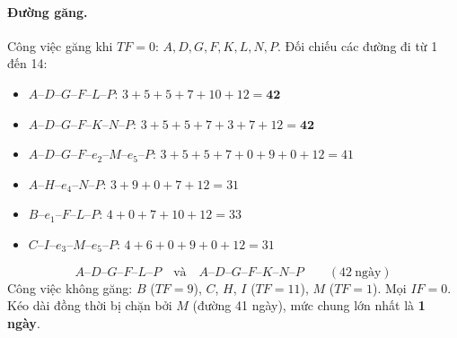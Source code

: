 \documentclass[12pt,a4paper]{article}
\begin{document}
\paragraph{Đường găng.}
\enlargethispage{3\baselineskip}
Công việc găng khi $TF=0$: $A,D,G,F,K,L,N,P$.
Đối chiếu các đường đi từ 1 đến 14:
\begin{itemize}[leftmargin=1.4em,itemsep=1pt,parsep=0pt,topsep=2pt]
  \item $A$--$D$--$G$--$F$--$L$--$P$: $3+5+5+7+10+12=\mathbf{42}$
  \item $A$--$D$--$G$--$F$--$K$--$N$--$P$: $3+5+5+7+3+7+12=\mathbf{42}$
  \item $A$--$D$--$G$--$F$--$e_2$--$M$--$e_5$--$P$: $3+5+5+7+0+9+0+12=41$
  \item $A$--$H$--$e_4$--$N$--$P$: $3+9+0+7+12=31$
  \item $B$--$e_1$--$F$--$L$--$P$: $4+0+7+10+12=33$
  \item $C$--$I$--$e_3$--$M$--$e_5$--$P$: $4+6+0+9+0+12=31$
\end{itemize}
\vspace{-4pt}
\[
  \boxed{A\text{--}D\text{--}G\text{--}F\text{--}L\text{--}P
  \quad\text{và}\quad
  A\text{--}D\text{--}G\text{--}F\text{--}K\text{--}N\text{--}P
  \qquad (42\ \text{ngày})}
\]
\vspace{-6pt}
{\small
Công việc không găng: $B$ ($TF=9$), $C$, $H$, $I$ ($TF=11$), $M$ ($TF=1$).
Mọi $IF=0$. Kéo dài đồng thời bị chặn bởi $M$ (đường 41 ngày), mức chung lớn nhất là \textbf{1 ngày}.}
\end{document}
